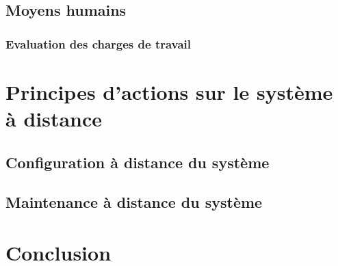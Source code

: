 \subsection{Moyens humains}
\subsubsection{Evaluation des charges de travail}

\section{Principes d'actions sur le système à distance}
\subsection{Configuration à distance du système}
\subsection{Maintenance à distance du système}
\section{Conclusion}






